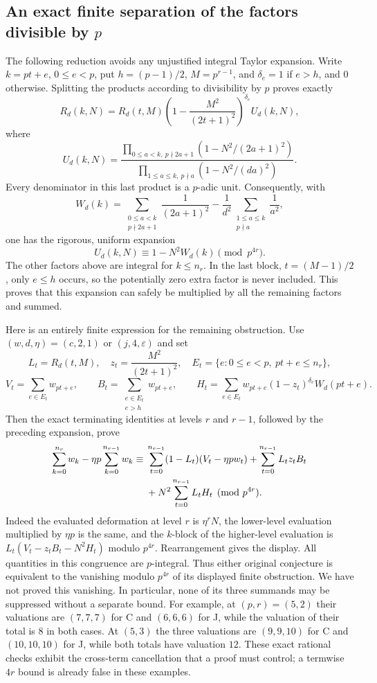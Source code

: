 \documentclass[11pt,letterpaper]{article}
\numberwithin{equation}{section}
\begin{document}
\subsection{An exact finite separation of the factors divisible by \texorpdfstring{$p$}{p}}
The following reduction avoids any unjustified integral Taylor expansion.
Write $k=pt+e$, $0\le e<p$, put $h=(p-1)/2$, $M=p^{r-1}$,
and $\delta_e=1$ if $e>h$, and $0$ otherwise. Splitting the products
according to divisibility by $p$ proves exactly
\[
 R_d(k,N)=R_d(t,M)
 \left(1-\frac{M^2}{(2t+1)^2}\right)^{\delta_e}U_d(k,N),
\]
where
\[
 U_d(k,N)=
 \frac{\prod_{0\le a<k,\ p\nmid 2a+1}(1-N^2/(2a+1)^2)}
 {\prod_{1\le a\le k,\ p\nmid a}(1-N^2/(da)^2)}.
\]
Every denominator in this last product is a $p$-adic unit. Consequently,
with
\[
 W_d(k)=\sum_{\substack{0\le a<k\\p\nmid 2a+1}}\frac1{(2a+1)^2}
 -\frac1{d^2}\sum_{\substack{1\le a\le k\\p\nmid a}}\frac1{a^2},
\]
one has the rigorous, uniform expansion
\[
 U_d(k,N)\equiv1-N^2W_d(k)\pmod{p^{4r}}.
\]
The other factors above are integral for $k\le n_r$. In the last block,
$t=(M-1)/2$, only $e\le h$ occurs, so the potentially zero extra factor
is never included. This proves that this expansion can safely be
multiplied by all the remaining factors and summed.

Here is an entirely finite expression for the remaining obstruction.
Use $(w,d,\eta)=(c,2,1)$ or $(j,4,\varepsilon)$ and set
\[
 L_t=R_d(t,M),\quad z_t=\frac{M^2}{(2t+1)^2},\quad
 E_t=\{e:0\le e<p,\ pt+e\le n_r\},
\]
\[
 V_t=\sum_{e\in E_t}w_{pt+e},\qquad
 B_t=\sum_{\substack{e\in E_t\\e>h}}w_{pt+e},\qquad
 H_t=\sum_{e\in E_t}w_{pt+e}(1-z_t)^{\delta_e}W_d(pt+e).
\]
Then the exact terminating identities at levels $r$ and $r-1$, followed
by the preceding expansion, prove
\begin{align}
 \sum_{k=0}^{n_r}w_k-\eta p\sum_{k=0}^{n_{r-1}}w_k
 \equiv{}&\sum_{t=0}^{n_{r-1}}(1-L_t)(V_t-\eta p w_t)
 +\sum_{t=0}^{n_{r-1}}L_t z_t B_t\notag\\
 &+N^2\sum_{t=0}^{n_{r-1}}L_tH_t\pmod{p^{4r}}.
\end{align}
Indeed the evaluated deformation at level $r$ is $\eta^rN$, the
lower-level evaluation multiplied by $\eta p$ is the same, and the
$k$-block of the higher-level evaluation is
$L_t(V_t-z_tB_t-N^2H_t)$ modulo $p^{4r}$. Rearrangement gives the display.
All quantities in this congruence are $p$-integral. Thus either original
conjecture is equivalent to the vanishing modulo $p^{4r}$ of its displayed
finite obstruction. We have not proved this vanishing. In particular,
none of its three summands may be suppressed without a separate bound.
For example, at $(p,r)=(5,2)$ their valuations are $(7,7,7)$ for C
and $(6,6,6)$ for J, while the valuation of their total is $8$ in both
cases. At $(5,3)$ the three valuations are $(9,9,10)$ for C and
$(10,10,10)$ for J, while both totals have valuation $12$. These exact
rational checks exhibit the cross-term cancellation that a proof must
control; a termwise $4r$ bound is already false in these examples.
\end{document}
